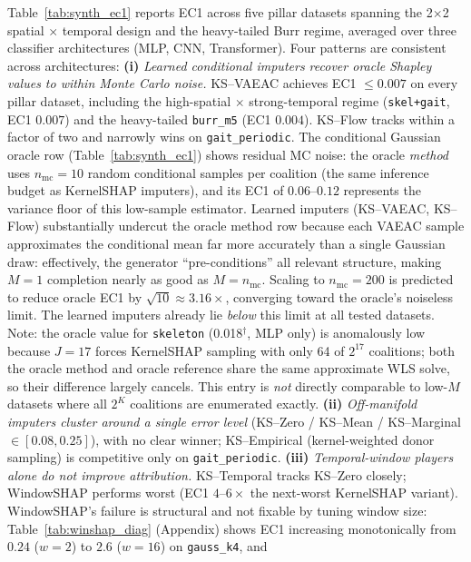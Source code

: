 Table~\ref{tab:synth_ec1} reports EC1 across five pillar datasets spanning
the 2$\times$2 spatial $\times$ temporal design and the heavy-tailed Burr
regime, averaged over three classifier architectures (MLP, CNN,
Transformer).  Four patterns are consistent across architectures:
\textbf{(i)} \emph{Learned conditional imputers recover oracle Shapley
values to within Monte Carlo noise.}  KS--VAEAC achieves EC1 $\le 0.007$
on every pillar dataset, including the high-spatial $\times$
strong-temporal regime (\texttt{skel+gait}, EC1 $0.007$) and the
heavy-tailed \texttt{burr\_m5} (EC1 $0.004$).  KS--Flow tracks within a
factor of two and narrowly wins on \texttt{gait\_periodic}.
The conditional Gaussian oracle row (Table~\ref{tab:synth_ec1}) shows
residual MC noise: the oracle \emph{method} uses $n_\text{mc}{=}10$
random conditional samples per coalition (the same inference budget as
KernelSHAP imputers), and its EC1 of $0.06$--$0.12$ represents the
variance floor of this low-sample estimator.  Learned imputers
(KS--VAEAC, KS--Flow) substantially undercut the oracle method row
because each VAEAC sample approximates the conditional mean far more
accurately than a single Gaussian draw: effectively, the generator
``pre-conditions'' all relevant structure, making $M{=}1$ completion
nearly as good as $M{=}n_\text{mc}$.  Scaling to $n_\text{mc}{=}200$ is
predicted to reduce oracle EC1 by $\sqrt{10}\approx 3.16\times$,
converging toward the oracle's noiseless limit.  The learned imputers
already lie \emph{below} this limit at all tested datasets.
Note: the oracle value for \texttt{skeleton} (0.018$^\dagger$, MLP only)
is anomalously low because $J{=}17$ forces KernelSHAP sampling with only
64 of $2^{17}$ coalitions; both the oracle method and oracle reference
share the same approximate WLS solve, so their difference largely cancels.
This entry is \emph{not} directly comparable to low-$M$ datasets
where all $2^K$ coalitions are enumerated exactly.
\textbf{(ii)} \emph{Off-manifold imputers cluster around a single error
level} (KS--Zero / KS--Mean / KS--Marginal $\in [0.08, 0.25]$), with no
clear winner; KS--Empirical (kernel-weighted donor sampling) is
competitive only on \texttt{gait\_periodic}.
\textbf{(iii)} \emph{Temporal-window players alone do not improve
attribution.}  KS--Temporal tracks KS--Zero closely; WindowSHAP performs
worst (EC1 $4$--$6\times$ the next-worst KernelSHAP variant).
WindowSHAP's failure is structural and not fixable by tuning window size:
Table~\ref{tab:winshap_diag} (Appendix) shows EC1 increasing monotonically
from $0.24$ ($w{=}2$) to $2.6$ ($w{=}16$) on \texttt{gauss\_k4}, and
